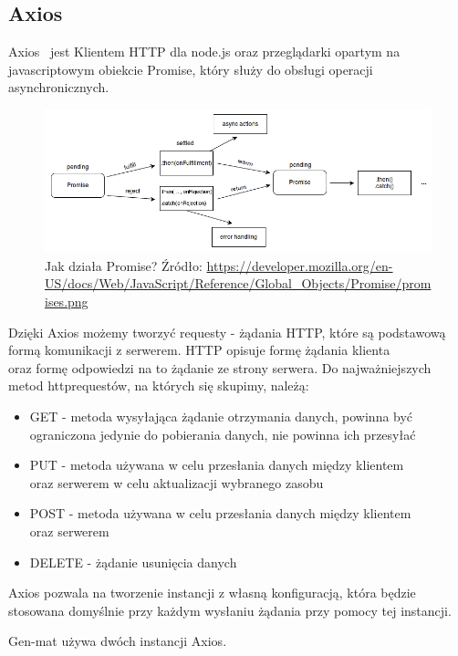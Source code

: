 \documentclass[oneside,polski,logo,indent]{amuthesis}
\begin{document}
\subsection{Axios}
Axios~\cite{axios} jest Klientem HTTP dla node.js oraz przeglądarki opartym na javascriptowym obiekcie Promise, który służy do obsługi operacji asynchronicznych.

\begin{figure}[H]
\centering
\includegraphics[width=13cm]{promises.png}
\caption{Jak działa Promise?
\newline
Źródło: \url{https://developer.mozilla.org/en-US/docs/Web/JavaScript/Reference/Global_Objects/Promise/promises.png}
}
\label{react dev example.jpg}
\end{figure}

Dzięki Axios możemy tworzyć requesty - żądania HTTP, które są podstawową formą komunikacji z serwerem. HTTP opisuje formę żądania klienta \\oraz formę odpowiedzi na to żądanie ze strony serwera. Do najważniejszych metod httprequestów, na których się skupimy, należą:
\begin{itemize}
\item GET - metoda wysyłająca żądanie otrzymania danych, powinna być ograniczona jedynie do pobierania danych, nie powinna ich przesyłać
\item PUT - metoda używana w celu przesłania danych między klientem  \\ oraz serwerem w celu aktualizacji wybranego zasobu
\item POST - metoda używana w celu przesłania danych między klientem \\  oraz serwerem
\item DELETE - żądanie usunięcia danych
\end{itemize}
Axios pozwala na tworzenie instancji z własną konfiguracją, która będzie stosowana domyślnie przy każdym wysłaniu żądania przy pomocy
tej instancji.


Gen-mat używa dwóch instancji Axios.
\end{document}

